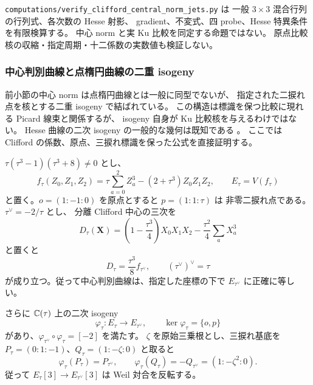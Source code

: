 \begin{remark}[検算と適用範囲]
\label{ifj:rem:central-norm-scope}
\texttt{computations/verify\_clifford\_central\_norm\_jets.py} は
一般 $3\times3$ 混合行列の行列式、各次数の Hesse 射影、
gradient、不変式、四 probe、Hesse 特異条件を有限検算する。
中心 norm と実 Ku 比較を同定する命題ではない。
原点比較核の収縮・指定周期・十二係数の実数値も検証しない。
\end{remark}

\subsubsection{中心判別曲線と点楕円曲線の二重 isogeny}
\label{ifj:subsubsec:central-two-isogeny}

前小節の中心 norm は点楕円曲線とは一般に同型でないが、
指定された二捩れ点を核とする二重 isogeny で結ばれている。
この構造は標識を保つ比較に現れる Picard 線束と関係するが、
isogeny 自身が Ku 比較核を与えるわけではない。
Hesse 曲線の二次 isogeny の一般的な幾何は既知である
\cite[Proposition~2.5]{IFJOudomphengCayleyan}\cite{IFJMoodyTwistedHessian}。
ここでは Clifford の係数、原点、三捩れ標識を保った公式を直接証明する。

\begin{theorem}
\label{ifj:thm:discriminant-two-isogeny}
$\tau(\tau^3-1)(\tau^3+8)\ne0$ とし、
\[
 f_\tau(Z_0,Z_1,Z_2)=\tau\sum_{a=0}^2 Z_a^3-(2+\tau^3)Z_0Z_1Z_2,
 \qquad E_\tau=V(f_\tau)
\]
と置く。$o=(1:-1:0)$ を原点とすると $p=(1:1:\tau)$ は
非零二捩れ点である。$\tau^\vee=-2/\tau$ とし、
分離 Clifford 中心の三次を
\[
 D_\tau(\mathbf X)=\left(1-\frac{\tau^3}{4}\right)X_0X_1X_2
                         -\frac{\tau^2}{4}\sum_a X_a^3
\]
と置くと
\begin{equation}\label{ifj:eq:discriminant-hesse-involution}
 D_\tau=\frac{\tau^3}{8}f_{\tau^\vee},\qquad
 (\tau^\vee)^\vee=\tau
\end{equation}
が成り立つ。従って中心判別曲線は、指定した座標の下で
$E_{\tau^\vee}$ に正確に等しい。

さらに $\mathbb C(\tau)$ 上の二次 isogeny
\begin{equation}\label{ifj:eq:explicit-two-isogeny}
 \varphi_\tau:E_\tau\longrightarrow E_{\tau^\vee},
 \qquad\ker\varphi_\tau=\{o,p\}
\end{equation}
があり、$\varphi_{\tau^\vee}\circ\varphi_\tau=[-2]$ を満たす。
$\zeta$ を原始三乗根とし、三捩れ基底を
$P_\tau=(0:1:-1)$、$Q_\tau=(1:-\zeta:0)$ と取ると
\begin{equation}\label{ifj:eq:two-isogeny-level-three}
 \varphi_\tau(P_\tau)=P_{\tau^\vee},\qquad
 \varphi_\tau(Q_\tau)=-Q_{\tau^\vee}=(1:-\zeta^2:0).
\end{equation}
従って $E_\tau[3]\to E_{\tau^\vee}[3]$ は Weil 対合を反転する。
\end{theorem}

